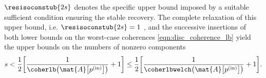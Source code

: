 $\resisoconstub{ 2s }$ denotes
the specific upper bound imposed by
a suitable sufficient condition ensuring
the stable recovery.
The complete relaxation of
this upper bound, i.e.
$\resisoconstub{ 2s } = 1$
\cite[134]{book:Foucart2013}, and
the successive insertions of
both lower bounds on
the worst-case coherences
\eqref{eqn:disc_coherence_lb} yield
the upper bounds on
the numbers of
nonzero components
\begin{equation}
  s
  <
  \frac{ 1 }{ 2 }
  \biggl[
    \frac{ 1 }{ \coherlb\bigl( \mat{A}\bigl[ p^{(\text{in})} \bigr] \bigr) }
    +
    1
  \biggr]
  \leq
  \frac{ 1 }{ 2 }
  \biggl[
    \frac{ 1 }{ \coherlbwelch\bigl( \mat{A}\bigl[ p^{(\text{in})} \bigr] \bigr) }
    +
    1
  \biggr].
 \label{eqn:disc_coherence_sparsity_ub}
\end{equation}


